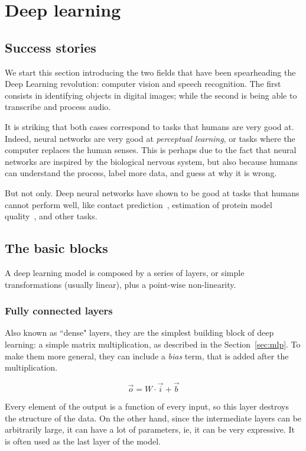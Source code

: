 \chapter{Deep learning}
\section{Success stories}
We start this section introducing the two fields that have been spearheading the Deep Learning revolution: computer vision and speech recognition.
The first consists in identifying objects in digital images; while the second is being able to transcribe and process audio.

It is striking that both cases correspond to tasks that humans are very good at.
Indeed, neural networks are very good at \emph{perceptual learning}, or tasks where the computer replaces the human senses.
This is perhaps due to the fact that neural networks are inspired by the biological nervous system, but also because humans can understand the process,
label more data, and guess at why it is wrong.

But not only.
Deep neural networks have shown to be good at tasks that humans cannot perform well, like contact prediction~\citep{ultra_deep_contacts}, estimation of protein model quality~\citep{casp13_ema}, and other tasks.


\section{The basic blocks}
A deep learning model is composed by a series of layers, or simple transformations (usually linear), plus a point-wise non-linearity.


\subsection{Fully connected layers}
Also known as ``dense" layers, they are the simplest building block of deep learning: a simple matrix multiplication, as described in the Section~\ref{sec:mlp}.
To make them more general, they can include a \emph{bias} term, that is added after the multiplication.

\begin{equation*}
\vec{o} = W \cdot \vec{i} + \vec{b}
\end{equation*}

Every element of the output is a function of every input, so this layer destroys the structure of the data.
On the other hand, since the intermediate layers can be arbitrarily large, it can have a lot of parameters, ie, it can be very expressive.
It is often used as the last layer of the model.

